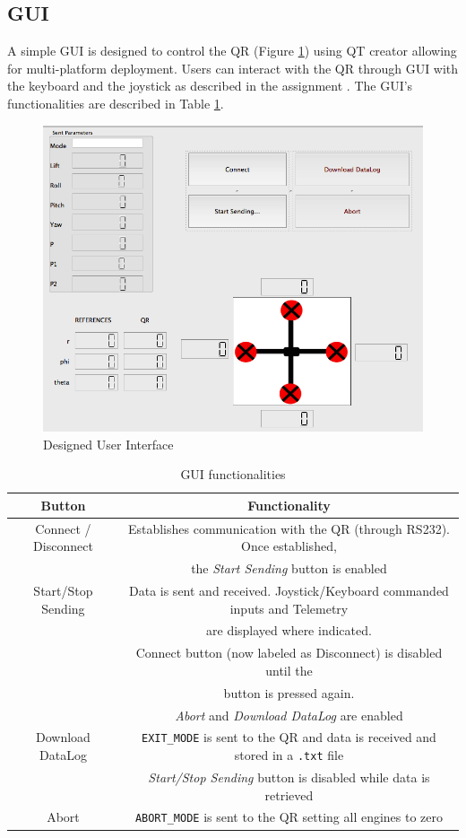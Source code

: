 \documentclass{article}
\begin{document}
\subsection{GUI}
A simple GUI is designed to control the QR (Figure \ref{fig.GUI}) using QT creator allowing for multi-platform deployment. Users can interact with the QR through GUI with the keyboard and the joystick as described in the assignment \cite{langendoen2014assignment}. The GUI's functionalities are described in Table \ref{tbl:GUIButts}. 

\begin{figure}[ht]
\centering
	\includegraphics[scale=0.4]{Figures/GUI.png}
	\caption{Designed User Interface}
	\label{fig.GUI}
\end{figure}

\begin{table}[ht]
\centering
\begin{tabular}{|c|c|}
\hline 
\textbf{Button} & \textbf{Functionality} \\ 
\hline 
\hline 
Connect / Disconnect & Establishes communication with the QR (through RS232). Once established, \\ & the \emph{Start Sending} button is enabled\\ 
\hline 
Start/Stop Sending & Data is sent and received. Joystick/Keyboard commanded inputs and Telemetry \\ & are displayed  where indicated. 
\\ & Connect button (now labeled as Disconnect) is disabled until the \\ & button is pressed again.
\\ & \emph{Abort} and \emph{Download DataLog} are enabled
\\
\hline 
Download DataLog & \texttt{EXIT\_MODE} is sent to the QR and data is received and stored in a \texttt{.txt} file
\\ & \emph{Start/Stop Sending} button is disabled while data is retrieved\\
\hline 
Abort & \texttt{ABORT\_MODE} is sent to the QR setting all engines to zero\\ 
\hline 
\end{tabular} 
\caption{GUI functionalities}
\label{tbl:GUIButts}
\end{table}
\end{document}
